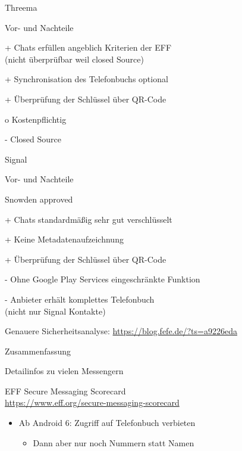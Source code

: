 \begin{frame}{Threema}
\begin{blex}{Vor- und Nachteile}
\item[+] Chats erfüllen angeblich Kriterien der EFF\\ (nicht überprüfbar weil closed Source)
\item[+] Synchronisation des Telefonbuchs optional
\item[+] Überprüfung der Schlüssel über QR-Code
\item[o] Kostenpflichtig
\item[-] Closed Source
\end{blex}
\end{frame}

\begin{frame}{Signal}
\begin{blex}{Vor- und Nachteile}
\item \glqq Snowden approved\grqq
\item[+] Chats standardmäßig sehr gut verschlüsselt
\item[+] Keine Metadatenaufzeichnung
\item[+] Überprüfung der Schlüssel über QR-Code
\item[-] Ohne Google Play Services eingeschränkte Funktion 
\item[-] Anbieter erhält komplettes Telefonbuch\\ (nicht nur Signal Kontakte)
\end{blex}
Genauere Sicherheitsanalyse: {\small\url{https://blog.fefe.de/?ts=a9226eda}}
\end{frame}

\begin{frame}{Zusammenfassung}
\begin{blit}{Detailinfos zu vielen Messengern}
\item EFF Secure Messaging Scorecard\\ {\small\url{https://www.eff.org/secure-messaging-scorecard}}
\end{blit}

\begin{itemize}
\item Ab Android 6: Zugriff auf Telefonbuch verbieten
\begin{itemize}
\item Dann aber nur noch Nummern statt Namen
\end{itemize}
\end{itemize}
\end{frame}

